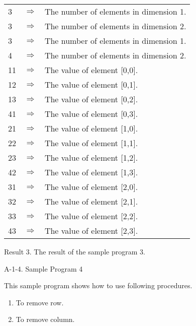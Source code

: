 \begin{center}
\begin{tabular}{|lll|}\hline
3  & $\Longrightarrow$  & The number of elements in dimension 1.\\
3  & $\Longrightarrow$  & The number of elements in dimension 2.\\
3  & $\Longrightarrow$  & The number of elements in dimension 1.\\
4  & $\Longrightarrow$  & The number of elements in dimension 2.\\
11 & $\Longrightarrow$  & The value of element [0,0].\\
12 & $\Longrightarrow$  & The value of element [0,1].\\
13 & $\Longrightarrow$  & The value of element [0,2].\\
41 & $\Longrightarrow$  & The value of element [0,3].\\
21 & $\Longrightarrow$  & The value of element [1,0].\\
22 & $\Longrightarrow$  & The value of element [1,1].\\
23 & $\Longrightarrow$  & The value of element [1,2].\\
42 & $\Longrightarrow$  & The value of element [1,3].\\
31 & $\Longrightarrow$  & The value of element [2,0].\\
32 & $\Longrightarrow$  & The value of element [2,1].\\
33 & $\Longrightarrow$  & The value of element [2,2].\\
43 & $\Longrightarrow$  & The value of element [2,3].\\\hline
\end{tabular}
\vspace*{5mm}

Result 3. The result of the sample program 3.
\end{center}

\vspace*{20mm}

\noindent
{\Large A-1-4. Sample Program 4}

\vspace*{7mm}

\noindent
This sample program shows how to use following procedures.

\begin{enumerate}
\item To remove row.
\item To remove column.
\end{enumerate}

